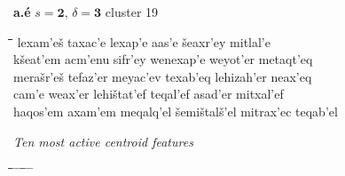 \begin{figure}[htb]
\begin{mdframed}
\vspace{2pt}
{\LARGE\textbf{a.\'{e}}} \hfill {\large$s = \mathbf{2}$, $\delta = \mathbf{3}$} \hfill {\normalsize cluster 19}
\vspace{3pt}
\begin{normalsize}
\begin{tabbing}
\hspace*{15ex}\= \hspace*{16ex}\=\hspace*{16ex}\=\hspace*{16ex}\=\hspace*{16ex}\=\hspace*{13ex} \kill
lexam\a'{e}\v{s} \> taxac\a'{e} \> lexap\a'{e} \> aas\a'{e} \> \v{s}eaxr\a'{e}y \> mitlal\a'{e} \\
k\v{s}eat\a'{e}m \> acm\a'{e}nu \> sifr\a'{e}y \> wenexap\a'{e} \> weyot\a'{e}r \> metaqt\a'{e}q \\
mera\v{s}r\a'{e}\v{s} \> tefaz\a'{e}r \> meyac\a'{e}v \> texab\a'{e}q \> lehizah\a'{e}r \> neax\a'{e}q \\
cam\a'{e} \> weax\a'{e}r \> lehi\v{s}tat\a'{e}f \> teqal\a'{e}f \> asad\a'{e}r \> mitxal\a'{e}f \\
haqos\a'{e}m \> axam\a'{e}m \> meqalq\a'{e}l \> \v{s}emi\v{s}tal\v{s}\a'{e}l \> mitrax\a'{e}c \> teqab\a'{e}l
\end{tabbing}
\end{normalsize}
\vspace{-3pt}
\begin{mdframed}
\begin{small}
\textit{Ten most active centroid features}
\vspace{-3pt}
\begin{tabbing}
\hspace*{7ex}\= \hspace*{12ex}\= \hspace*{7ex}\= \hspace*{12ex} \= \hspace*{7ex} \= \hspace*{12ex} \= \hspace*{6ex}\= \hspace*{12ex} \= \hspace*{6ex} \= \hspace*{10ex}\kill

\end{tabbing}
\end{small}
\end{mdframed}
\end{mdframed}
\end{figure}
